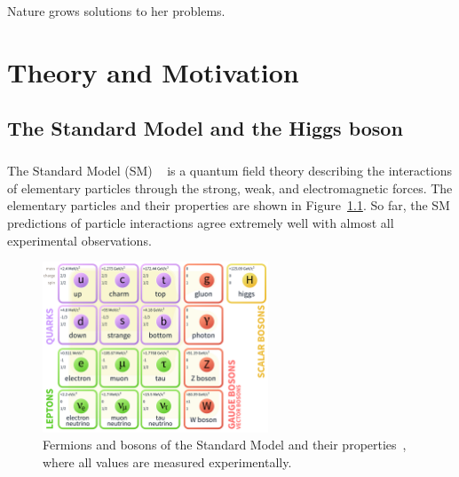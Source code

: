 \begin{savequote}[75mm]
Nature grows solutions to her problems.
\end{savequote}

\chapter{Theory and Motivation}

\section{The Standard Model and the Higgs boson}
\paragraph{}
The Standard Model (SM) ~\cite{Pdg,Griffiths,Tully,Schwartz} is a quantum field theory describing the interactions of elementary particles through the strong, weak, and electromagnetic forces. 
The elementary particles and their properties are shown in Figure~\ref{fig:SM}. 
So far, the SM predictions of particle interactions agree extremely well with almost all experimental observations.

\begin{figure}[htbp!]
  \centering
  \captionsetup{justification=centering}
  \includegraphics[width=0.6\textwidth]{figures/theory/SM}
  \caption{Fermions and bosons of the Standard Model and their properties~\cite{Pdg}, where all  values are measured experimentally.}
  \label{fig:SM}
\end{figure}

